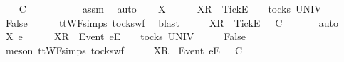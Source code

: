 \ \isamarkupfalse%
\ {\isachardoublequoteopen}{\isasymrho}\ {\isasymlesssim}\isactrlsub C\ {\isasymsigma}{\isacharprime}{\isacharprime}{\isachardoublequoteclose}\isanewline
\ \ \ \ \isamarkupfalse%
\ {}\ {}\ {}\ {}\ assm{}\ \isamarkupfalse%
\ auto\isanewline
{}\isamarkupfalse%
\isanewline
\ \ \isamarkupfalse%
\ X\ {\isasymrho}\ {\isasymsigma}{\isacharprime}{\isacharprime}\isanewline
\ \ \isamarkupfalse%
\ {\isachardoublequoteopen}{\isacharbrackleft}X{\isacharbrackright}\isactrlsub R\ {\isacharhash}\ {\isacharbrackleft}Tick{\isacharbrackright}\isactrlsub E\ {\isacharhash}\ {\isasymrho}\ {\isasymin}\ tocks\ UNIV{\isachardoublequoteclose}\isanewline
\ \ \isamarkupfalse%
\ \isamarkupfalse%
\ {\isachardoublequoteopen}False{\isachardoublequoteclose}\isanewline
\ \ \ \ \isamarkupfalse%
\ ttWF{\isachardot}simps{\isacharparenleft}{}{}{\isacharparenright}\ tocks{\isacharunderscore}wf\ \isamarkupfalse%
\ blast\isanewline
\ \ \isamarkupfalse%
\ \isamarkupfalse%
\ {\isachardoublequoteopen}{\isacharbrackleft}X{\isacharbrackright}\isactrlsub R\ {\isacharhash}\ {\isacharbrackleft}Tick{\isacharbrackright}\isactrlsub E\ {\isacharhash}\ {\isasymrho}\ {\isasymlesssim}\isactrlsub C\ {\isasymsigma}{\isacharprime}{\isacharprime}{\isachardoublequoteclose}\isanewline
\ \ \ \ \isamarkupfalse%
\ auto\isanewline
{}\isamarkupfalse%
\isanewline
\ \ \isamarkupfalse%
\ X\ e\ {\isasymrho}\ {\isasymsigma}{\isacharprime}{\isacharprime}\isanewline
\ \ \isamarkupfalse%
\ {\isachardoublequoteopen}{\isacharbrackleft}X{\isacharbrackright}\isactrlsub R\ {\isacharhash}\ {\isacharbrackleft}Event\ e{\isacharbrackright}\isactrlsub E\ {\isacharhash}\ {\isasymrho}\ {\isasymin}\ tocks\ UNIV{\isachardoublequoteclose}\isanewline
\ \ \isamarkupfalse%
\ \isamarkupfalse%
\ {\isachardoublequoteopen}False{\isachardoublequoteclose}\isanewline
\ \ \ \ \isamarkupfalse%
\ {\isacharparenleft}meson\ ttWF{\isachardot}simps{\isacharparenleft}{}{}{\isacharparenright}\ tocks{\isacharunderscore}wf{\isacharparenright}\isanewline
\ \ \isamarkupfalse%
\ \isamarkupfalse%
\ {\isachardoublequoteopen}{\isacharbrackleft}X{\isacharbrackright}\isactrlsub R\ {\isacharhash}\ {\isacharbrackleft}Event\ e{\isacharbrackright}\isactrlsub E\ {\isacharhash}\ {\isasymrho}\ {\isasymlesssim}\isactrlsub C\ {\isasymsigma}{\isacharprime}{\isacharprime}{\isachardoublequoteclose}\isanewline
